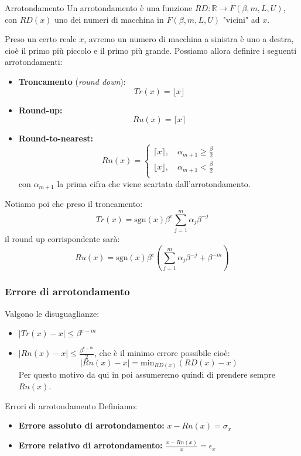 \documentclass[a4paper,11pt]{article}
\begin{document}
\begin{definition}{Arrotondamento}
	Un arrotondamento è una funzione $RD: \mathbb{R} \rightarrow F(\beta, m, L, U)$, con $RD(x)$ uno dei numeri di macchina in $F(\beta, m, L, U)$ "vicini" ad $x$.
\end{definition}

Preso un certo reale $x$, avremo un numero di macchina a sinistra è uno a destra, cioè il primo più piccolo e il primo più grande.
Possiamo allora definire i seguenti arrotondamenti:
\begin{itemize}
	\item \textbf{Troncamento} (\textit{round down}): $$ Tr(x) = \lfloor x \rfloor $$
	\item \textbf{Round-up:} $$ Ru(x) = \lceil x \rceil$$
	\item \textbf{Round-to-nearest:} 
		$$
		Rn(x) =
			\begin{cases}
				\lceil x \rceil, \quad \alpha_{m + 1} \geq \frac{\beta}{2} \\ 
				\lfloor x \rfloor, \quad \alpha_{m + 1} < \frac{\beta}{2} \\ 
			\end{cases}
		$$
		con $\alpha_{m + 1}$ la prima cifra che viene scartata dall'arrotondamento. 
\end{itemize}

Notiamo poi che preso il troncamento: 
$$
Tr(x) = \mathrm{sgn}(x) \beta^e \sum_{j = 1}^{m} \alpha_j \beta^{-j}
$$ 
il round up corrispondente sarà: 
$$
Ru(x) = \mathrm{sgn}(x) \beta^e \left( \sum_{j = 1}^{m} \alpha_j \beta^{-j} + \beta^{-m}\right)
$$

\subsubsection{Errore di arrotondamento}
Valgono le disuguaglianze:
\begin{itemize}
	\item $ |Tr(x) - x| \leq \beta^{e - m} $ \\ 
	\item $ |Rn(x) - x| \leq \frac{\beta^{e - m}}{2} $, che è il minimo errore possibile cioè:
		$$
			|Rn(x) - x| = \mathrm{min}_{RD(x)}(RD(x) - x)
		$$
	Per questo motivo da qui in poi assumeremo quindi di prendere sempre $Rn(x)$.
\end{itemize}

\begin{definition}{Errori di arrotondamento}
	Definiamo:
	\begin{itemize}
		\item \textbf{Errore assoluto di arrotondamento:} $x - Rn(x) = \sigma_x$
		\item \textbf{Errore relativo di arrotondamento:} $\frac{x - Rn(x)}{x} = \epsilon_x$
	\end{itemize}
\end{definition}
\end{document}
